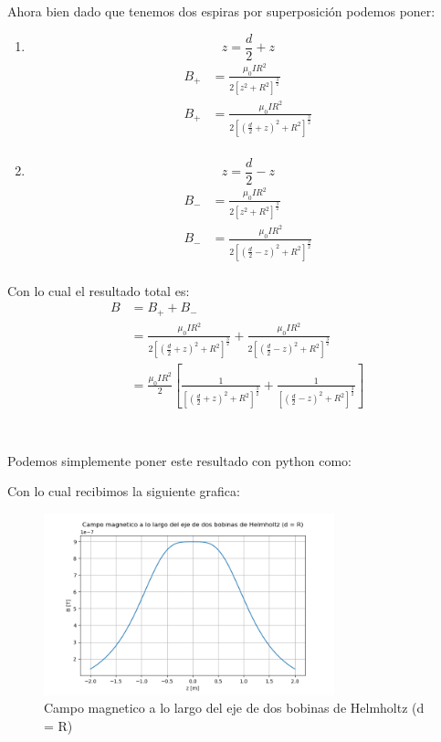 \documentclass{report}
\begin{document}
Ahora bien dado que tenemos dos espiras por superposición podemos poner:

\begin{enumerate}
	\item $$z = \frac{d}{2} + z$$
		\begin{align*}
			B_+ &= \frac{\mu_0 I R^2}{2\left[ z^2 + R^2\right]^{\frac{3}{2}}}\\
			B_+ &= \frac{\mu_0 I R^2}{2\left[ \left(\frac{d}{2} + z\right)^2 + R^2\right]^{\frac{3}{2}}}\\
		\end{align*}
	\item $$z = \frac{d}{2} - z$$
		\begin{align*}
			B_- &= \frac{\mu_0 I R^2}{2\left[ z^2 + R^2\right]^{\frac{3}{2}}}\\
			B_- &= \frac{\mu_0 I R^2}{2\left[ \left(\frac{d}{2} - z\right)^2 + R^2\right]^{\frac{3}{2}}}\\
		\end{align*}
\end{enumerate}

Con lo cual el resultado total es:
\begin{align*}
	B &= B_+ + B_-\\
	& = \frac{\mu_0 I R^2}{2\left[ \left(\frac{d}{2} + z\right)^2 + R^2\right]^{\frac{3}{2}}} + \frac{\mu_0 I R^2}{2\left[ \left(\frac{d}{2} - z\right)^2 + R^2\right]^{\frac{3}{2}}}\\
	& = \frac{\mu_0 I R^2}{2} \left[\frac{1}{\left[ \left(\frac{d}{2} + z\right)^2 + R^2\right]^{\frac{3}{2}}} + \frac{1}{\left[ \left(\frac{d}{2} - z\right)^2 + R^2\right]^{\frac{3}{2}}}\right]\\
\end{align*}

\section{}

Podemos simplemente poner este resultado con python como:


Con lo cual recibimos la siguiente grafica:

\begin{figure}[H]
	\begin{center}
		\includegraphics[width=0.75\textwidth]{img/punto_12_b.png}
	\end{center}
	\caption{Campo magnetico a lo largo del eje de dos bobinas de Helmholtz (d = R)}\label{fig:Punto_12_b}
\end{figure}
\end{document}
